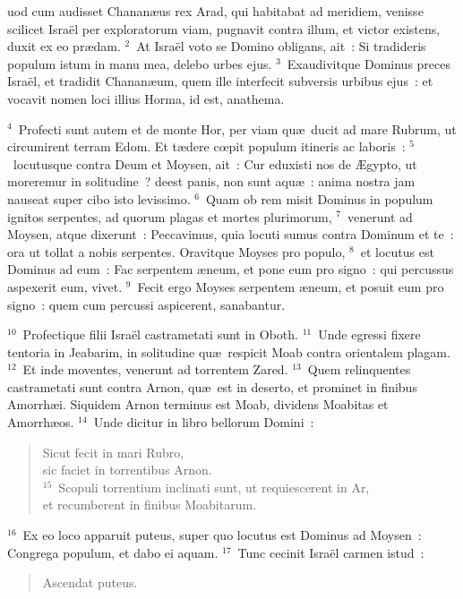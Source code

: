 \bchapter
{}uod cum audisset Chanan\ae us rex Arad, qui habitabat ad meridiem, venisse scilicet Isra\"el per exploratorum viam, pugnavit contra illum, et victor existens, duxit ex eo pr\ae dam.
${}^{2}$~At Isra\"el voto se Domino obligans, ait~: Si tradideris populum istum in manu mea, delebo urbes ejus.
${}^{3}$~Exaudivitque Dominus preces Isra\"el, et tradidit Chanan\ae um, quem ille interfecit subversis urbibus ejus~: et vocavit nomen loci illius Horma, id est, anathema.


${}^{4}$~Profecti sunt autem et de monte Hor, per viam qu\ae\ ducit ad mare Rubrum, ut circumirent terram Edom. Et t\ae dere cœpit populum itineris ac laboris~:
${}^{5}$~locutusque contra Deum et Moysen, ait~: Cur eduxisti nos de \AE gypto, ut moreremur in solitudine~? deest panis, non sunt aqu\ae~: anima nostra jam nauseat super cibo isto levissimo.
${}^{6}$~Quam ob rem misit Dominus in populum ignitos serpentes, ad quorum plagas et mortes plurimorum,
${}^{7}$~venerunt ad Moysen, atque dixerunt~: Peccavimus, quia locuti sumus contra Dominum et te~: ora ut tollat a nobis serpentes. Oravitque Moyses pro populo,
${}^{8}$~et locutus est Dominus ad eum~: Fac serpentem \ae neum, et pone eum pro signo~: qui percussus aspexerit eum, vivet.
${}^{9}$~Fecit ergo Moyses serpentem \ae neum, et posuit eum pro signo~: quem cum percussi aspicerent, sanabantur.


${}^{10}$~Profectique filii Isra\"el castrametati sunt in Oboth.
${}^{11}$~Unde egressi fixere tentoria in Jeabarim, in solitudine qu\ae\ respicit Moab contra orientalem plagam.
${}^{12}$~Et inde moventes, venerunt ad torrentem Zared.
${}^{13}$~Quem relinquentes castrametati sunt contra Arnon, qu\ae\ est in deserto, et prominet in finibus Amorrh\ae i. Siquidem Arnon terminus est Moab, dividens Moabitas et Amorrh\ae os.
${}^{14}$~Unde dicitur in libro bellorum Domini~: \begin{flushleft}\begin{verse}Sicut fecit in mari Rubro,\\ sic faciet in torrentibus Arnon.\\
${}^{15}$~Scopuli torrentium inclinati sunt, ut requiescerent in Ar,\\ et recumberent in finibus Moabitarum.\end{verse}\end{flushleft}


${}^{16}$~Ex eo loco apparuit puteus, super quo locutus est Dominus ad Moysen~: Congrega populum, et dabo ei aquam.
${}^{17}$~Tunc cecinit Isra\"el carmen istud~: \begin{flushleft}\begin{verse}Ascendat puteus.\end{verse}\end{flushleft}

